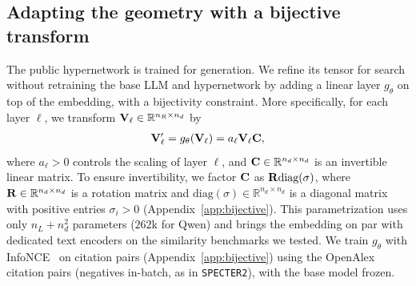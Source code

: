 \subsection{Adapting the geometry with a bijective transform}
\label{sec:kron-method}

The public hypernetwork is trained for generation.
We refine its tensor for search without retraining the base LLM and hypernetwork by adding a linear layer $g_\theta$ on top of the embedding, with a bijectivity constraint.
More specifically, for each layer $\ell$, we transform ${\mathbf{V}}_{\ell}\in\mathbb{R}^{n_R\times n_d}$ by
\begin{align}
   \label{eq:transform}
   {\mathbf{V}}'_{\ell} = g_\theta({\mathbf{V}}_{\ell}) = a_\ell {\mathbf{V}}_{\ell} {\mathbf{C}},
\end{align}
where $a_\ell>0$ controls the scaling of layer $\ell$, and ${\mathbf{C}}\in\mathbb{R}^{n_d\times n_d}$ is an invertible linear matrix.
To ensure invertibility, we factor ${\mathbf{C}}$ as ${\mathbf{R}} \text{diag}(\sigma)$, where ${\mathbf{R}}\in\mathbb{R}^{n_d\times n_d}$ is a rotation matrix and $\text{diag}(\sigma)\in\mathbb{R}^{n_d\times n_d}$ is a diagonal matrix with positive entries $\sigma_i>0$ (Appendix~\ref{app:bijective}).
This parametrization uses only $n_L + n_d^2$ parameters ($262$k for Qwen) and brings the embedding on par with dedicated text encoders on the similarity benchmarks we tested.
We train $g_\theta$ with InfoNCE~\citep{oord2018infonce} on citation pairs (Appendix~\ref{app:bijective}) using the OpenAlex citation pairs (negatives in-batch, as in \texttt{SPECTER2}), with the base model frozen.
